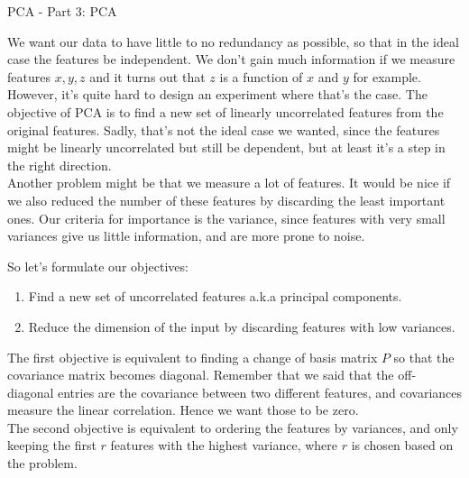 \begin{entry}[4]{PCA - Part 3: PCA}
\begin{entrysection}
    We want our data to have little to no redundancy as possible, so that in the ideal case the features be independent. We don't gain much information if we measure features $x, y, z$ and it turns out that $z$ is a function of $x$ and $y$ for example. However, it's quite hard to design an experiment where that's the case. The objective of PCA is to find a new set of linearly uncorrelated features from the original features. Sadly, that's not the ideal case we wanted, since the features might be linearly uncorrelated but still be dependent, but at least it's a step in the right direction. \\
    
    \noindent Another problem might be that we measure a lot of features. It would be nice if we also reduced the number of these features by discarding the least important ones. Our criteria for importance is the variance, since features with very small variances give us little information, and are more prone to noise. 
\end{entrysection}

\begin{entrysection} [Objectives]
So let's formulate our objectives:
\begin{enumerate}
    \item Find a new set of uncorrelated features a.k.a principal components.
    \item Reduce the dimension of the input by discarding features with low variances.
\end{enumerate}
The first objective is equivalent to finding a change of basis matrix $P$ so that the covariance matrix becomes diagonal. Remember that we said that the off-diagonal entries are the covariance between two different features, and covariances measure the linear correlation. Hence we want those to be zero. \\

\noindent The second objective is equivalent to ordering the features by variances, and only keeping the first $r$ features with the highest variance, where $r$ is chosen based on the problem.
\end{entrysection}


\end{entry}
